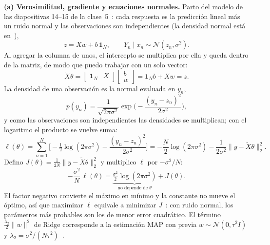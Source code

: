 \documentclass[10pt,a4paper]{article}
\newcommand{\Xt}{\tilde X}
\begin{document}
\textbf{(a) Verosimilitud, gradiente y ecuaciones normales.}
Parto del modelo de las diapositivas 14--15 de la clase~5~\cite{clase5}: cada respuesta es la predicción lineal más un ruido normal y las observaciones son independientes (la densidad normal está en~\cite[cap.~2]{pml1}),
\[ z=Xw+b\,\bm 1_N,\qquad Y_n\mid x_n\sim\mathcal N(z_n,\sigma^2). \]
Al agregar la columna de unos, el intercepto se multiplica por ella y queda dentro de la matriz, de modo que puedo trabajar con un solo vector:
\[ \Xt\theta=\begin{bmatrix}\bm 1_N & X\end{bmatrix}\begin{bmatrix}b\\ w\end{bmatrix}=\bm 1_Nb+Xw=z. \]
La densidad de una observación es la normal evaluada en $y_n$,
\[ p(y_n)=\frac{1}{\sqrt{2\pi\sigma^2}}\exp\!\Big(-\frac{(y_n-z_n)^2}{2\sigma^2}\Big), \]
y como las observaciones son independientes las densidades se multiplican; con el logaritmo el producto se vuelve suma:
\[ \ell(\theta)=\sum_{n=1}^N\Big[-\tfrac12\log(2\pi\sigma^2)-\frac{(y_n-z_n)^2}{2\sigma^2}\Big]=-\frac N2\log(2\pi\sigma^2)-\frac{1}{2\sigma^2}\lVert y-\Xt\theta\rVert_2^2 . \]
Defino $J(\theta)=\frac1{2N}\lVert y-\Xt\theta\rVert_2^2$ y multiplico $\ell$ por $-\sigma^2/N$:
\[ -\frac{\sigma^2}{N}\,\ell(\theta)=\underbrace{\tfrac{\sigma^2}{2}\log(2\pi\sigma^2)}_{\text{no depende de }\theta}+J(\theta). \]
El factor negativo convierte el máximo en mínimo y la constante no mueve el óptimo, así que maximizar $\ell$ equivale a minimizar $J$~\cite[secc.~4.2]{pml1}: con ruido normal, los parámetros más probables son los de menor error cuadrático. El término $\frac{\lambda_2}{2}\lVert w\rVert^2$ de Ridge corresponde a la estimación MAP con previa $w\sim\mathcal N(0,\tau^2I)$ y $\lambda_2=\sigma^2/(N\tau^2)$~\cite[secc.~4.5.3]{pml1}.
\end{document}
